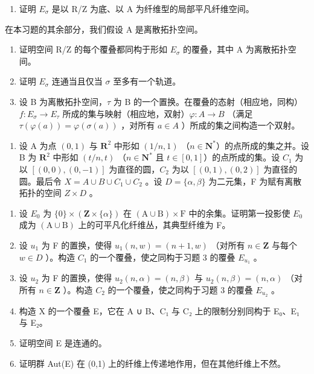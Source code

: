 \begin{enumerate}
\def\labelenumi{\alph{enumi})}
\tightlist
\item
  证明 \(E_{\sigma}\) 是以 R/Z 为底、以 A 为纤维型的局部平凡纤维空间。
\end{enumerate}

在本习题的其余部分，我们假设 A 是离散拓扑空间。

\begin{enumerate}
\def\labelenumi{\alph{enumi})}
\setcounter{enumi}{1}
\item
  证明空间 R/Z 的每个覆叠都同构于形如 \(E_{\sigma}\) 的覆叠，其中 A 为离散拓扑空间。
\item
  证明 \(E_{\sigma}\) 连通当且仅当 \(\sigma\) 至多有一个轨道。
\item
  设 B 为离散拓扑空间，\(\tau\) 为 B 的一个置换。在覆叠的态射（相应地，同构）\(f: E_{\sigma} \to E_{\tau}\) 所成的集与映射（相应地，双射）\(\varphi: A \to B\) （满足 \(\tau(\varphi(a)) = \varphi(\sigma(a))\) ，对所有 \(a \in A\) ）所成的集之间构造一个双射。
\end{enumerate}

\begin{enumerate}
\def\labelenumi{\arabic{enumi})}
\setcounter{enumi}{3}
\tightlist
\item
  设 A 为点 \((0,1)\) 与 \(\mathbf{R}^{2}\) 中形如 \((1/n,1)\) （\(n \in \mathbf{N}^{*}\)）的点所成的集之并。设 B 为 \(\mathbf{R}^{2}\) 中形如 \((t/n,t)\) （\(n \in \mathbf{N}^{*}\) 且 \(t \in [0,1]\)）的点所成的集。设 \(C_{1}\) 为以 \([(0,0),(0,-1)]\) 为直径的圆，\(C_{2}\) 为以 \([(0,1),(0,2)]\) 为直径的圆。最后令 \(X = A \cup B \cup C_{1} \cup C_{2}\) 。设 \(D = \{\alpha, \beta\}\) 为二元集，F 为赋有离散拓扑的空间 \(Z \times D\) 。
\end{enumerate}

\begin{enumerate}
\def\labelenumi{\alph{enumi})}
\item
  设 \(E_{0}\) 为 \(\{0\}\times(\mathbf{Z}\times\{\alpha\})\) 在 \((\mathrm{A}\cup\mathrm{B})\times\mathrm{F}\) 中的余集。证明第一投影使 \(E_{0}\) 成为 \((\mathrm{A}\cup\mathrm{B})\) 上的可平凡化纤维丛，其典型纤维为 F。
\item
  设 \(u_{1}\) 为 F 的置换，使得 \(u_{1}(n,w)=(n+1,w)\) （对所有 \(n\in\mathbf{Z}\) 与每个 \(w\in D\) ）。构造 \(C_{1}\) 的一个覆叠，使之同构于习题 3 的覆叠 \(E_{u_{1}}\) 。
\item
  设 \(u_{2}\) 为 F 的置换，使得 \(u_{2}(n,\alpha)=(n,\beta)\) 与 \(u_{2}(n,\beta)=(n,\alpha)\) （对所有 \(n\in\mathbf{Z}\) ）。构造 \(C_{2}\) 的一个覆叠，使之同构于习题 3 的覆叠 \(E_{u_{2}}\) 。
\item
  构造 X 的一个覆叠 E，它在 A ∪ B、C₁ 与 C₂ 上的限制分别同构于 E₀、E₁ 与 E₂。
\item
  证明空间 E 是连通的。
\item
  证明群 Aut(E) 在 (0,1) 上的纤维上传递地作用，但在其他纤维上不然。
\end{enumerate}

